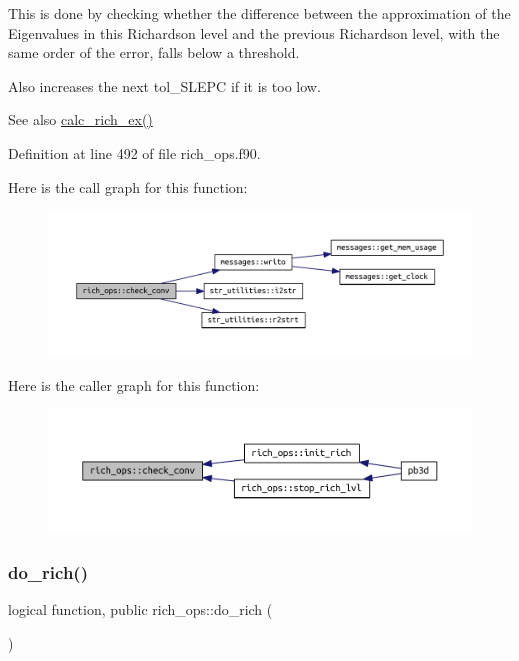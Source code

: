 This is done by checking whether the difference between the approximation of the Eigenvalues in this Richardson level and the previous Richardson level, with the same order of the error, falls below a threshold.

Also increases the next tol\+\_\+\+S\+L\+E\+PC if it is too low.

\begin{DoxySeeAlso}{See also}
\hyperlink{namespacerich__ops_ad2717df0206a397d0d7845a96aa5da23}{calc\+\_\+rich\+\_\+ex()} 
\end{DoxySeeAlso}


Definition at line 492 of file rich\+\_\+ops.\+f90.

Here is the call graph for this function\+:\nopagebreak
\begin{figure}[H]
\begin{center}
\leavevmode
\includegraphics[width=350pt]{namespacerich__ops_ac00cce686d45540b238b3b6e39c9bdeb_cgraph}
\end{center}
\end{figure}
Here is the caller graph for this function\+:\nopagebreak
\begin{figure}[H]
\begin{center}
\leavevmode
\includegraphics[width=350pt]{namespacerich__ops_ac00cce686d45540b238b3b6e39c9bdeb_icgraph}
\end{center}
\end{figure}
\mbox{\label{namespacerich__ops_a50f4088b9ddd59597987fb4112f2a73e}} 
\subsubsection{\texorpdfstring{do\+\_\+rich()}{do\_rich()}}
{\footnotesize\ttfamily logical function, public rich\+\_\+ops\+::do\+\_\+rich (\begin{DoxyParamCaption}{ }\end{DoxyParamCaption})}



